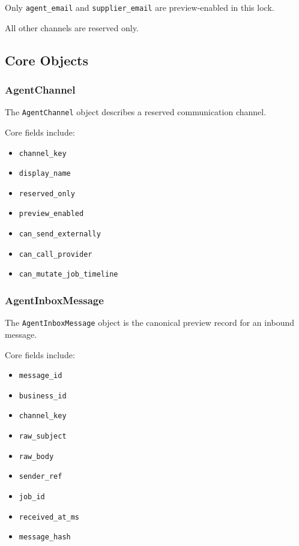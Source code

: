Only \texttt{agent\_email} and \texttt{supplier\_email} are preview-enabled in this lock.

All other channels are reserved only.

\subsection{Core Objects}

\subsubsection{AgentChannel}

The \texttt{AgentChannel} object describes a reserved communication channel.

Core fields include:

\begin{itemize}
  \item \texttt{channel\_key}
  \item \texttt{display\_name}
  \item \texttt{reserved\_only}
  \item \texttt{preview\_enabled}
  \item \texttt{can\_send\_externally}
  \item \texttt{can\_call\_provider}
  \item \texttt{can\_mutate\_job\_timeline}
\end{itemize}

\subsubsection{AgentInboxMessage}

The \texttt{AgentInboxMessage} object is the canonical preview record for an inbound message.

Core fields include:

\begin{itemize}
  \item \texttt{message\_id}
  \item \texttt{business\_id}
  \item \texttt{channel\_key}
  \item \texttt{raw\_subject}
  \item \texttt{raw\_body}
  \item \texttt{sender\_ref}
  \item \texttt{job\_id}
  \item \texttt{received\_at\_ms}
  \item \texttt{message\_hash}
\end{itemize}

